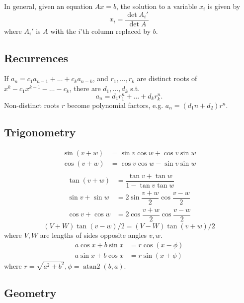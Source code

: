 \begin{multicols}{\Columns}
In general, given an equation $Ax = b$, the solution to a variable $x_i$ is given by
\[x_i = \frac{\det A_i'}{\det A} \]
where $A_i'$ is $A$ with the $i$'th column replaced by $b$.

\subsection{Recurrences}
If $a_n = c_1 a_{n-1} + \dots + c_k a_{n-k}$, and $r_1, \dots, r_k$ are distinct roots of $x^k - c_1 x^{k-1} - \dots - c_k$, there are $d_1, \dots, d_k$ s.t.
\[a_n = d_1r_1^n + \dots + d_kr_k^n. \]
Non-distinct roots $r$ become polynomial factors, e.g. $a_n = (d_1n + d_2)r^n$.

\subsection{Trigonometry}
\begin{align*}
\sin(v+w)&{}=\sin v\cos w+\cos v\sin w\\
\cos(v+w)&{}=\cos v\cos w-\sin v\sin w\\
\end{align*}
\begin{align*}
\tan(v+w)&{}=\dfrac{\tan v+\tan w}{1-\tan v\tan w}\\
\sin v+\sin w&{}=2\sin\dfrac{v+w}{2}\cos\dfrac{v-w}{2}\\
\cos v+\cos w&{}=2\cos\dfrac{v+w}{2}\cos\dfrac{v-w}{2}
\end{align*}
\[ (V+W)\tan(v-w)/2{}=(V-W)\tan(v+w)/2 \]
where $V, W$ are lengths of sides opposite angles $v, w$.
\begin{align*}
	a\cos x+b\sin x&=r\cos(x-\phi)\\
	a\sin x+b\cos x&=r\sin(x+\phi)
\end{align*}
where $r=\sqrt{a^2+b^2}, \phi=\operatorname{atan2}(b,a)$.

\subsection{Geometry}


\end{multicols}
